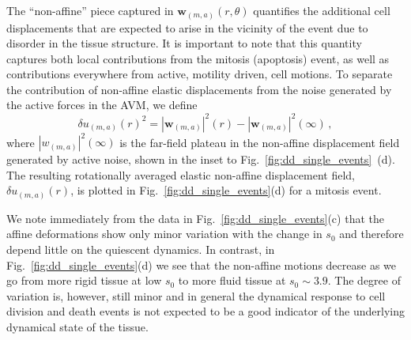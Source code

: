 \documentclass[
reprint
,aps
,amssymb
,amsmath
,superscriptaddress
]{revtex4-1}
\newcommand{\lisa}[1]{{\color{red}#1}}
\begin{document}
The ``non-affine'' piece captured in $\bm{w}_{(m,a)}(r, \theta)$ quantifies the additional cell displacements that are expected to arise in the vicinity of the event due to disorder in the tissue structure. It is important to note that this quantity captures both local contributions from the mitosis (apoptosis) event, as well as contributions everywhere from active, motility driven, cell motions. %
To separate the contribution of non-affine elastic displacements from the noise generated by the active forces in the AVM, we define 
%
\begin{equation}\label{eq:dd_nonaffine_displacements}
\delta u_{(m,a)}(r)^2 = |\mathbf{w}_{(m,a)}|^2(r) - |\mathbf{w}_{(m,a)}|^2(\infty) \, , 
\end{equation}
%
where $|w_{(m,a)}|^2(\infty)$ is the far-field plateau in the non-affine displacement field generated by active noise, shown in the inset to Fig.~\ref{fig:dd_single_events}~(d). The resulting rotationally averaged elastic non-affine displacement field, $\delta u_{(m,a)}(r)$, is plotted in Fig.~\ref{fig:dd_single_events}(d) for a mitosis event.

We note immediately from the data in Fig.~\ref{fig:dd_single_events}(c) that the affine deformations show only minor variation with the change in $s_0$ and therefore depend little on the quiescent dynamics. In contrast, in Fig.~\ref{fig:dd_single_events}(d) we see that the non-affine motions decrease as we go from more rigid tissue at low $s_0$ to more fluid tissue at $s_0 \sim 3.9$. The degree of variation is, however, still minor and in general the dynamical response to cell division and death events is not expected to be a good indicator of the underlying dynamical state of the tissue.
\end{document}

